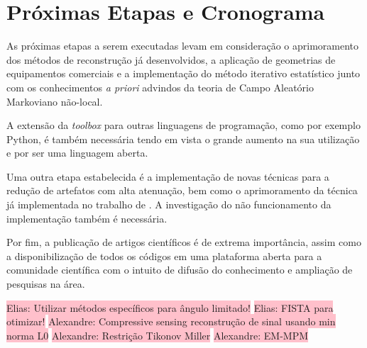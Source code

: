 \chapter[Próximas Etapas e Cronograma]{Próximas Etapas e Cronograma}\label{Capitulo7}

As próximas etapas a serem executadas levam em consideração o aprimoramento dos métodos de reconstrução já desenvolvidos, a aplicação de geometrias de equipamentos comerciais e a implementação do método iterativo estatístico junto com os conhecimentos \textit{a priori} advindos da teoria de Campo Aleatório Markoviano não-local.

A extensão da \textit{toolbox} para outras linguagens de programação, como por exemplo Python, é também necessária tendo em vista o grande aumento na sua utilização e por ser uma linguagem aberta.

Uma outra etapa estabelecida é a implementação de novas técnicas para a redução de artefatos com alta atenuação, bem como o aprimoramento da técnica já implementada no trabalho de . A investigação do não funcionamento da implementação também é necessária. 

Por fim, a publicação de artigos científicos é de extrema importância, assim como a disponibilização de todos os códigos em uma plataforma aberta para a comunidade científica com o intuito de difusão do conhecimento e ampliação de pesquisas na área. 

\colorbox{pink}{Elias: Utilizar métodos específicos para ângulo limitado!}
\colorbox{pink}{Elias: FISTA para otimizar!}
\colorbox{pink}{Alexandre: Compressive sensing reconstrução de sinal usando min norma L0}
\colorbox{pink}{Alexandre: Restrição Tikonov Miller}
\colorbox{pink}{Alexandre: EM-MPM}




